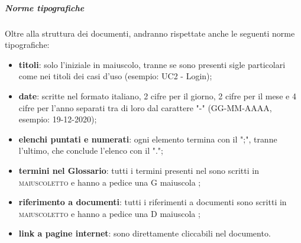 		\subparagraph{Norme tipografiche}
		Oltre alla struttura dei documenti, andranno rispettate anche le seguenti norme tipografiche:
		\begin{itemize}
			\item \textbf{titoli}: solo l'iniziale in maiuscolo, tranne se sono presenti sigle particolari come nei titoli dei casi d'uso (esempio: UC2 - Login);
			\item \textbf{date}: scritte nel formato italiano, 2 cifre per il giorno, 2 cifre per il mese e 4 cifre per l'anno separati tra di loro dal carattere "-" (GG-MM-AAAA, esempio: 19-12-2020);
			\item \textbf{elenchi puntati e numerati}: ogni elemento termina con il ";", tranne l'ultimo, che conclude l'elenco con il ".";
			\item \textbf{termini nel Glossario}: tutti i termini presenti nel  sono scritti in \textsc{maiuscoletto} e hanno a pedice una G maiuscola \glock{};
			\item \textbf{riferimento a documenti}: tutti i riferimenti a documenti sono scritti in \textsc{maiuscoletto} e hanno a pedice una D maiuscola \dext{};
			\item \textbf{link a pagine internet}: sono direttamente cliccabili nel documento.
		\end{itemize}
		
